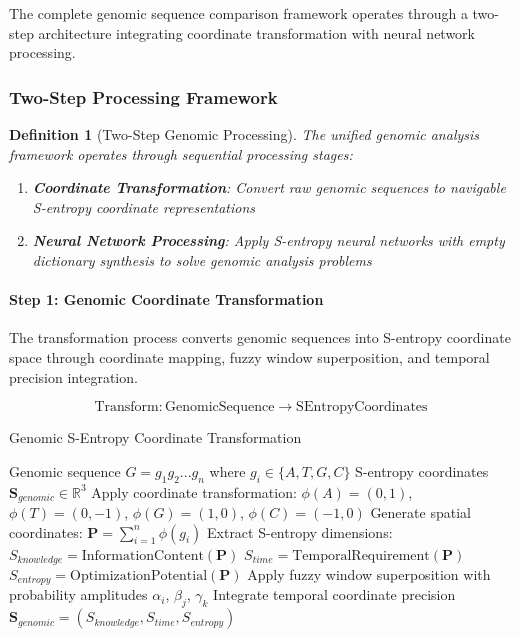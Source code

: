 \documentclass[12pt,a4paper]{article}
\newtheorem{definition}{Definition}
\begin{document}
The complete genomic sequence comparison framework operates through a two-step architecture integrating coordinate transformation with neural network processing.

\subsubsection{Two-Step Processing Framework}

\begin{definition}[Two-Step Genomic Processing]
The unified genomic analysis framework operates through sequential processing stages:
\begin{enumerate}
\item \textbf{Coordinate Transformation}: Convert raw genomic sequences to navigable S-entropy coordinate representations
\item \textbf{Neural Network Processing}: Apply S-entropy neural networks with empty dictionary synthesis to solve genomic analysis problems
\end{enumerate}
\end{definition}

\paragraph{Step 1: Genomic Coordinate Transformation}

The transformation process converts genomic sequences into S-entropy coordinate space through coordinate mapping, fuzzy window superposition, and temporal precision integration.

\begin{equation}
\text{Transform}: \text{GenomicSequence} \rightarrow \text{SEntropyCoordinates}
\end{equation}

\begin{algorithm}[H]
\caption{Genomic S-Entropy Coordinate Transformation}
\begin{algorithmic}[1]
\REQUIRE Genomic sequence $G = g_1g_2...g_n$ where $g_i \in \{A,T,G,C\}$
\ENSURE S-entropy coordinates $\mathbf{S}_{genomic} \in \mathbb{R}^3$
\STATE Apply coordinate transformation: $\phi(A) = (0,1)$, $\phi(T) = (0,-1)$, $\phi(G) = (1,0)$, $\phi(C) = (-1,0)$
\STATE Generate spatial coordinates: $\mathbf{P} = \sum_{i=1}^n \phi(g_i)$
\STATE Extract S-entropy dimensions:
\STATE \quad $S_{knowledge} = \text{InformationContent}(\mathbf{P})$
\STATE \quad $S_{time} = \text{TemporalRequirement}(\mathbf{P})$  
\STATE \quad $S_{entropy} = \text{OptimizationPotential}(\mathbf{P})$
\STATE Apply fuzzy window superposition with probability amplitudes $\alpha_i$, $\beta_j$, $\gamma_k$
\STATE Integrate temporal coordinate precision
\RETURN $\mathbf{S}_{genomic} = (S_{knowledge}, S_{time}, S_{entropy})$
\end{algorithmic}
\end{algorithm}
\end{document}
